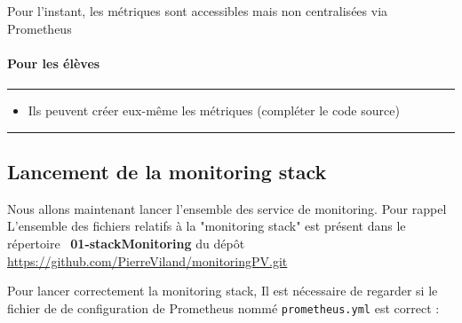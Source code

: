 \documentclass[french, 12pt]{article}%
\newcommand{\itemE}{\item[$\bullet$]}
\newif\ifPROF
\begin{document}
Pour l'instant, les métriques sont accessibles mais non centralisées via Prometheus




\paragraph{Pour les élèves}
\begin{center}
 \rule{0.75\linewidth}{1pt}
 \end{center}
 \begin{itemize}
 \itemE Ils peuvent créer eux-même les métriques (compléter le code source)
 \end{itemize}
\begin{center}
 \rule{0.75\linewidth}{1pt}
 \end{center}



\ifPROF
\color{red}
\begin{lstlisting}[style=commande]  
 HELP http_post_nb_requete_total Nombre total de requete POST
# TYPE http_post_nb_requete_total counter
http_post_nb_requete_total 47.0
# HELP http_post_nb_requete_created Nombre total de requete POST
# TYPE http_post_nb_requete_created gauge
http_post_nb_requete_created 1.7358412745360215e+09
# HELP http_temps_reponse Histogramme des temps de reponse HTTP (s)
# TYPE http_temps_reponse histogram
http_temps_reponse_bucket{le="0.001"} 22.0
http_temps_reponse_bucket{le="0.0015"} 23.0
http_temps_reponse_bucket{le="0.002"} 44.0
http_temps_reponse_bucket{le="0.003"} 47.0
http_temps_reponse_bucket{le="0.005"} 47.0
http_temps_reponse_bucket{le="0.0075"} 47.0
http_temps_reponse_bucket{le="+Inf"} 47.0
http_temps_reponse_count 47.0
\end{lstlisting}

\normalcolor
\fi




\subsection{Lancement de la monitoring stack}

Nous allons maintenant lancer l'ensemble des service de monitoring. Pour rappel L'ensemble des fichiers relatifs à la "monitoring stack" est présent dans le répertoire \ \textbf{01-stackMonitoring} du dépôt  \href{https://github.com/PierreViland/monitoringPV.git}{https://github.com/PierreViland/monitoringPV.git}

Pour lancer correctement la monitoring stack, Il est nécessaire de regarder si le fichier de de configuration de Prometheus nommé \verb?prometheus.yml? est correct :
\end{document}
